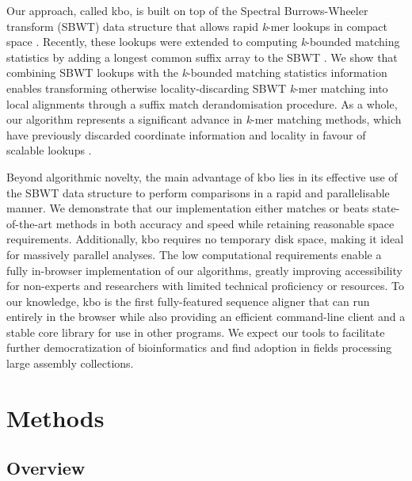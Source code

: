 \documentclass[unnumsec,webpdf,contemporary,large]{oup-authoring-template}%
\theoremstyle{thmstyleone}%
\theoremstyle{thmstyletwo}%
\theoremstyle{thmstylethree}%
\begin{document}
Our approach, called {\sf kbo}, is built on top of the Spectral Burrows-Wheeler transform (SBWT) data structure that allows rapid \emph{k}-mer lookups in compact space \cite{alanko2023small}. Recently, these lookups were extended to computing \emph{k}-bounded matching statistics by adding a longest common suffix array to the SBWT \cite{alanko2023longest,alanko2024finimizers}. We show that combining SBWT lookups with the \emph{k}-bounded matching statistics information enables transforming otherwise locality-discarding SBWT \emph{k}-mer matching into local alignments through a suffix match derandomisation procedure. As a whole, our algorithm represents a significant advance in \emph{k}-mer matching methods, which have previously discarded coordinate information and locality in favour of scalable lookups \cite{alanko2023themisto,fan2024fulgor}.

Beyond algorithmic novelty, the main advantage of {\sf kbo} lies in its effective use of the SBWT data structure to perform comparisons in a rapid and parallelisable manner. We demonstrate that our implementation either matches or beats state-of-the-art methods in both accuracy and speed while retaining reasonable space requirements. Additionally, {\sf kbo} requires no temporary disk space, making it ideal for massively parallel analyses. The low computational requirements enable a fully in-browser implementation of our algorithms, greatly improving accessibility for non-experts and researchers with limited technical proficiency or resources. To our knowledge, {\sf kbo} is the first fully-featured sequence aligner that can run entirely in the browser while also providing an efficient command-line client and a stable core library for use in other programs. We expect our tools to facilitate further democratization of bioinformatics and find adoption in fields processing large assembly collections.

\section{Methods}\label{methods}
\subsection{Overview}
\end{document}
